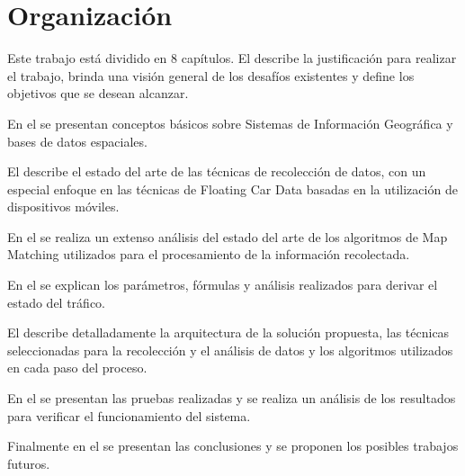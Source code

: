 \section{Organización}

Este trabajo está dividido en 8 capítulos. El  describe la justificación para realizar el trabajo, brinda una visión general de los desafíos existentes y define los objetivos que se desean alcanzar.

En el  se presentan conceptos básicos sobre Sistemas de Información Geográfica y bases de datos espaciales.

El  describe el estado del arte de las técnicas de recolección de datos, con un especial enfoque en las técnicas de Floating Car Data basadas en la utilización de dispositivos móviles. 

En el  se realiza un extenso análisis del estado del arte de los algoritmos de Map Matching utilizados para el procesamiento de la información recolectada.

En el  se explican los parámetros, fórmulas y análisis realizados para derivar el estado del tráfico.

El  describe detalladamente la arquitectura de la solución propuesta, las técnicas seleccionadas para la recolección y el análisis de datos y los algoritmos utilizados en cada paso del proceso.

En el  se presentan las pruebas realizadas y se realiza un análisis de los resultados para verificar el funcionamiento del sistema.

Finalmente en el  se presentan las conclusiones y se proponen los posibles trabajos futuros.
